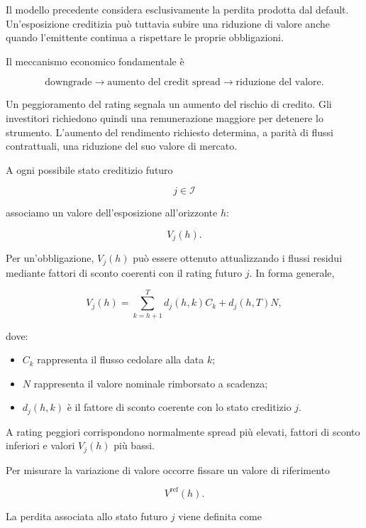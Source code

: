 \label{subsec:cap9-perdita-migrazione}

Il modello precedente considera esclusivamente la perdita prodotta dal
default. Un'esposizione creditizia pu\`{o} tuttavia subire una
riduzione di valore anche quando l'emittente continua a rispettare le
proprie obbligazioni.

Il meccanismo economico fondamentale \`{e}

\[
\text{downgrade}
\longrightarrow
\text{aumento del credit spread}
\longrightarrow
\text{riduzione del valore}.
\]

Un peggioramento del rating segnala un aumento del rischio di credito.
Gli investitori richiedono quindi una remunerazione maggiore per
detenere lo strumento. L'aumento del rendimento richiesto determina,
a parit\`{a} di flussi contrattuali, una riduzione del suo valore di
mercato.

A ogni possibile stato creditizio futuro

\[
j\in\mathcal{I}
\]

associamo un valore dell'esposizione all'orizzonte $h$:

\[
V_j(h).
\]

Per un'obbligazione, $V_j(h)$ pu\`{o} essere ottenuto attualizzando i
flussi residui mediante fattori di sconto coerenti con il rating
futuro $j$. In forma generale,

\[
V_j(h)
=
\sum_{k=h+1}^{T}
d_j(h,k)C_k
+
d_j(h,T)N,
\]

dove:

\begin{itemize}

\item $C_k$ rappresenta il flusso cedolare alla data $k$;

\item $N$ rappresenta il valore nominale rimborsato a scadenza;

\item $d_j(h,k)$ \`{e} il fattore di sconto coerente con lo stato
creditizio $j$.

\end{itemize}

A rating peggiori corrispondono normalmente spread pi\`{u} elevati,
fattori di sconto inferiori e valori $V_j(h)$ pi\`{u} bassi.

Per misurare la variazione di valore occorre fissare un valore di
riferimento

\[
V^{\mathrm{ref}}(h).
\]

La perdita associata allo stato futuro $j$ viene definita come

